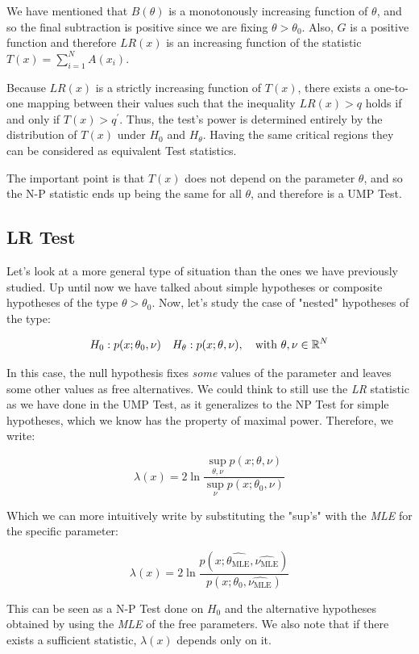 We have mentioned that $B(\theta)$ is a monotonously increasing function of $\theta$, and so the final subtraction is positive since we are fixing $\theta>\theta_0$. Also, $G$ is a positive function and therefore $LR(x)$ is an increasing function of the statistic $T(x) = \sum_{i=1}^NA(x_i)$. 

Because $LR(x)$ is a strictly increasing function of $T(x)$, there exists a one-to-one mapping between their values such that the inequality $LR(x) > q$ holds if and only if $T(x) > q^\prime$. Thus, the test's power is determined entirely by the distribution of $T(x)$ under $H_0$ and $H_\theta$. Having the same critical regions they can be considered as equivalent Test statistics. 

The important point is that $T(x)$ does not depend on the parameter $\theta$, and so the N-P statistic ends up being the same for all $\theta$, and therefore is a UMP Test. 

\subsection{LR Test}
Let's look at a more general type of situation than the ones we have previously studied. Up until now we have talked about simple hypotheses or composite hypotheses of the type $\theta>\theta_0$. Now, let's study the case of "nested" hypotheses of the type:

	\[
	H_0: p(x;\theta_0,\nu) \quad H_\theta: p(x;\theta, \nu), \quad \text{with }\theta,\nu\in\mathbb{R}^N
	\]

In this case, the null hypothesis fixes \emph{some} values of the parameter and leaves some other values as free alternatives. We could think to still use the \emph{LR} statistic as we have done in the UMP Test, as it generalizes to the NP Test for simple hypotheses, which we know has the property of maximal power. Therefore, we write:

	\[
	\lambda(x) = 2\ln \frac{\sup_{\theta,\nu}p(x;\theta,\nu)}{\sup_{\nu}p(x;\theta_0,\nu)}
	\]

Which we can more intuitively write by substituting the "sup's" with the \emph{MLE} for the specific parameter:

	\[
	\lambda(x) = 2\ln \frac{p(x;\hat{\theta_{\text{MLE}}},\hat{\nu_{\text{MLE}}})}{p(x;\theta_0,\hat{\nu_{\text{MLE}}})}
	\]

This can be seen as a N-P Test done on $H_0$ and the alternative hypotheses obtained by using the \emph{MLE} of the free parameters. We also note that if there exists a sufficient statistic, $\lambda(x)$ depends only on it.

